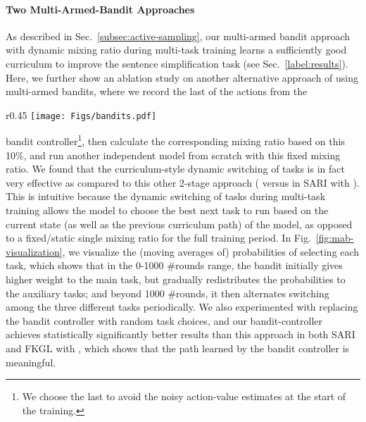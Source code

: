 \documentclass[11pt]{article}
\begin{document}
\paragraph{Two Multi-Armed-Bandit Approaches}
As described in Sec.~\ref{subsec:active-sampling}, our multi-armed bandit approach with dynamic mixing ratio during multi-task training learns a sufficiently good curriculum to improve the sentence simplification task (see Sec.~\ref{label:results}). Here, we further show an ablation study on another alternative approach of using multi-armed bandits, where we record the last  of the actions from the 
\begin{wrapfigure}[14]{r}{0.45\textwidth}
  \centering
  \vspace{0pt}
  \texttt{[image: Figs/bandits.pdf]}
  \vspace{-26pt}
  \caption{Task selection probability over training trajectory, predicted by bandit controller.}
	\label{fig:mab-visualization}
\end{wrapfigure}
bandit controller\footnote{We choose the last  to avoid the noisy action-value estimates at the start of the training.}, then calculate the corresponding mixing ratio based on this 10\%, and run another independent model from scratch with this fixed mixing ratio. We found that the curriculum-style dynamic switching of tasks is in fact very effective as compared to this other 2-stage approach ( versus  in SARI with ). This is intuitive because the dynamic switching of tasks during multi-task training allows the model to choose the best next task to run based on the current state (as well as the previous curriculum path) of the model, as opposed to a fixed/static single mixing ratio for the full training period. 
In Fig.~\ref{fig:mab-visualization}, we visualize the (moving averages of) probabilities of selecting each task, which shows that in the 0-1000 \#rounds range, the bandit initially gives higher weight to the main task, but gradually redistributes the probabilities to the auxiliary tasks; and beyond 1000 \#rounds, it then alternates switching among the three different tasks periodically. 
We also experimented with replacing the bandit controller with random task choices, and our bandit-controller achieves statistically significantly better results than this approach in both SARI and FKGL with , which shows that the path learned by the bandit controller is meaningful.
\end{document}
